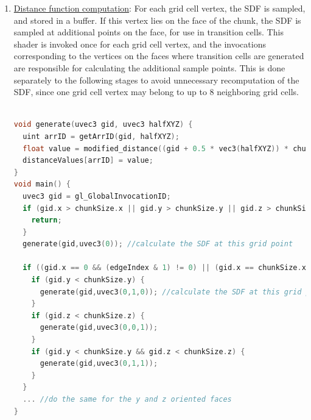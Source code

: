 \documentclass[11pt]{article}
\begin{document}
\begin{enumerate}
\item \underline{Distance function computation}: For each grid cell vertex, the SDF is sampled, and stored in a buffer. If this vertex lies on the face of the chunk, the SDF is sampled at additional points on the face, for use in transition cells. This shader is invoked once for each grid cell vertex, and the invocations corresponding to the vertices on the faces where transition cells are generated are responsible for calculating the additional sample points. This is done separately to the following stages to avoid unnecessary recomputation of the SDF, since one grid cell vertex may belong to up to 8 neighboring grid cells.

\begin{lstlisting}[language=C++,label={tv_generate},caption={Part of the GLSL code responsible for sampling the SDF in the parallel Transvoxel algorithm. This code snippet samples the SDF at the actual grid point, as well as at points surrounding it on the -X and +X facing faces. Lines 7-17 are repeated for the remaining faces of the chunk. Figure \ref{fig:tv_gen_grid} demonstrates which sample points would be calculated in various invocations of this algorithm. The \texttt{generate} function is responsible for sampling the SDF and storing the value in a buffer, and takes 2 parameters: the first is the actual position of the grid cell vertex, and the second is an offset parameter, for generating sample values halfway beetween grid vertices. For example, a value of \texttt{uvec3(0,1,0)} corresponds to a point that is offset from the position in the first argument by half a grid cell in the Y direction.}]

void generate(uvec3 gid, uvec3 halfXYZ) {
  uint arrID = getArrID(gid, halfXYZ);
  float value = modified_distance((gid + 0.5 * vec3(halfXYZ)) * chunkStride + chunkPosition);
  distanceValues[arrID] = value;
}
void main() {
  uvec3 gid = gl_GlobalInvocationID;
  if (gid.x > chunkSize.x || gid.y > chunkSize.y || gid.z > chunkSize.z) {
    return;
  }
  generate(gid,uvec3(0)); //calculate the SDF at this grid point

  if ((gid.x == 0 && (edgeIndex & 1) != 0) || (gid.x == chunkSize.x && (edgeIndex & 2) != 0)) {
    if (gid.y < chunkSize.y) {
      generate(gid,uvec3(0,1,0)); //calculate the SDF at this grid point, offset by half the grid width in the y direction
    }
    if (gid.z < chunkSize.z) {
      generate(gid,uvec3(0,0,1));
    }
    if (gid.y < chunkSize.y && gid.z < chunkSize.z) {
      generate(gid,uvec3(0,1,1));
    }
  }
  ... //do the same for the y and z oriented faces  
}
\end{lstlisting}


\end{enumerate}
\end{document}
